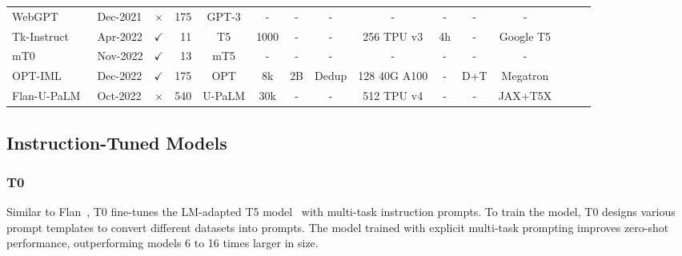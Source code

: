 \begin{table}[tbp]
{\begin{tabular}{llcrccccccccccc}
WebGPT~\cite{nakano2021webgpt}   & Dec-2021  &$\times$  & 175   & GPT-3   & -  & - & -  & -   & -  &  - &  -  \\

Tk-Instruct~\cite{Tk-INSTRUCT}  & Apr-2022   & $\checkmark$ & 11    & T5  & 1000  & - & - & 256 TPU v3   & 4h  & -  & Google T5   \\

mT0~\cite{mT0}  & Nov-2022  & $\checkmark$  & 13    & mT5 & -  & - & - & -  & -   & -  & - \\

OPT-IML~\cite{OPT_IML}  & Dec-2022  & $\checkmark$ & 175   & OPT & 8k  & 2B & Dedup & 128 40G A100   & - & D+T & Megatron    \\

Flan-U-PaLM~\cite{Flan}  & Oct-2022  & $\times$ & 540   & U-PaLM  & 30k  & - & -  & 512 TPU v4 & - & - & JAX+T5X  \\


\bottomrule
\end{tabular}}
\label{tab:statistics_it}
\end{table}




\subsection{Instruction-Tuned Models}

\subsubsection{T0}
Similar to Flan~\cite{Flan}, T0 fine-tunes the LM-adapted T5 model~\cite{LMAdapted} with multi-task instruction prompts. To train the model, T0 designs various prompt templates to convert different datasets into prompts. The model trained with explicit multi-task prompting improves zero-shot performance, outperforming models 6 to 16 times larger in size.  

